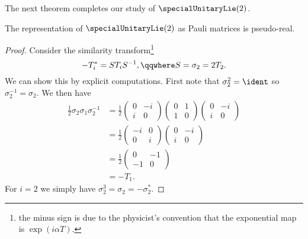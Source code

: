The next theorem completes our study of \(\specialUnitaryLie(2)\).
\begin{thm}{}{}
    The representation of \(\specialUnitaryLie(2)\) as Pauli matrices is pseudo-real.
    \begin{proof}
        Consider the similarity transform\footnote{the minus sign is due to the physicist's convention that the exponential map is \(\exp(i\alpha T)\).}
        \begin{equation}
            -T_i^* = ST_iS^{-1}, \qqwhere S = \sigma_2 = 2T_2.
        \end{equation}
        We can show this by explicit computations.
        First note that \(\sigma_2^2 = \ident\) so \(\sigma_2^{-1} = \sigma_{2}\).
        We then have
        \begin{align}
            \frac{1}{2}\sigma_2\sigma_1\sigma_2^{-1} &= \frac{1}{2}
            \begin{pmatrix}
                0 & -i\\
                i & 0
            \end{pmatrix}
            \begin{pmatrix}
                0 & 1\\
                1 & 0
            \end{pmatrix}
            \begin{pmatrix}
                0 & -i\\
                i & 0
            \end{pmatrix}
            \\
            &= \frac{1}{2}
            \begin{pmatrix}
                -i & 0\\
                0 & i
            \end{pmatrix}
            \begin{pmatrix}
                0 & -i\\
                i & 0
            \end{pmatrix}
            \\
            &= \frac{1}{2}
            \begin{pmatrix}
                0 & -1\\
                -1 & 0
            \end{pmatrix}
            \\
            &= -T_1.
        \end{align}
        For \(i = 2\) we simply have \(\sigma_2^3 = \sigma_2 = -\sigma_2^*\).

\end{proof}
\end{thm}
